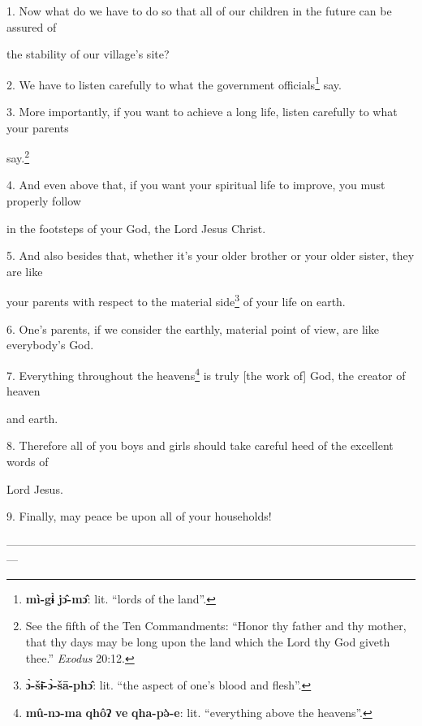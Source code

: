 \setcounter{footnote}{0}

1. Now what do we have to do so that all of our children in the future can be assured
of

the stability of our village's site?

2. We have to listen carefully to what the government officials\footnote{\textbf{mì-gɨ̀} \textbf{jɔ̂-mɔ̂}: lit. ``lords of the land''.} say.

3. More importantly, if you want to achieve a long life, listen carefully to what
your parents

say.\footnote{See the fifth of the Ten Commandments: ``Honor thy father and thy mother, that thy days may be long upon the land which the Lord thy God giveth thee.'' \textit{Exodus} 20:12.}

4. And even above that, if you want your spiritual life to improve, you must properly
follow

in the footsteps of your God, the Lord Jesus Christ.

5. And also besides that, whether it's your older brother or your older sister,
they are like

your parents with respect to the material side\footnote{\textbf{ɔ̀-šɨ̄-ɔ̀-šā-phɔ̂}: lit. ``the aspect of one's blood and flesh''.} of your life on earth.

6. One's parents, if we consider the earthly, material point of view, are like
everybody's God.

7. Everything throughout the heavens\footnote{\textbf{mû-nɔ-ma} \textbf{qhôʔ} \textbf{ve} \textbf{qha-pə̀-e}: lit. ``everything above the heavens''.} is truly [the work of] God, the creator
of heaven

and earth.

8. Therefore all of you boys and girls should take careful heed of the excellent
words of

Lord Jesus.

9. Finally, may peace be upon all of your households!

---------------------------------------------------------------------------------------------------------------

